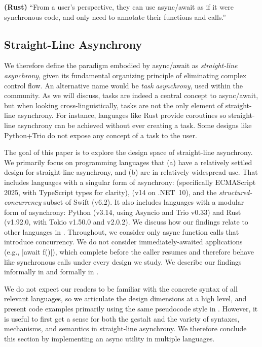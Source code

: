 \begin{displayquote}%
  \textbf{(Rust)}
  ``From a user's perspective, they can use async/await as if it were synchronous code, and only need to annotate their functions and calls.''~\cite{withoutboats_2394_2018}
\end{displayquote}

\subsection{Straight-Line Asynchrony}
\label{sec:straightline-async}

We therefore define the paradigm embodied by async/await as \emph{straight-line asynchrony}, given its fundamental organizing principle of eliminating complex control flow. An alternative name would be \emph{task asynchrony}, used within the \CSharp community. As we will discuss, tasks are indeed a central concept to async/await, but when looking cross-linguistically, tasks are not the only element of straight-line asynchrony. For instance, languages like Rust provide coroutines so straight-line asynchrony can be achieved without ever creating a task. Some designs like Python+Trio do not expose any concept of a task to the user.

The goal of this paper is to explore the design space of straight-line asynchrony. We primarily focus on programming languages that (a) have a relatively settled design for straight-line asynchrony, and (b) are in relatively widespread use. That includes languages with a singular form of asynchrony: \Js (specifically ECMAScript 2025, with TypeScript types for clarity), \CSharp (v14 on .NET~10), and the \emph{structured-concurrency} subset of Swift (v6.2). It also includes languages with a modular form of asynchrony: Python (v3.14, using Asyncio and Trio v0.33) and Rust (v1.92.0, with Tokio v1.50.0 and \smol v2.0.2). We discuss how our findings relate to other languages in .
Throughout, we consider only async function calls that introduce concurrency. We do not consider immediately-awaited applications (e.g., \code|await f()|), which complete before the caller resumes and therefore behave like synchronous calls under every design we study.
We describe our findings informally in  and formally in .

We do not expect our readers to be familiar with the concrete syntax of all relevant languages, so we articulate the design dimensions at a high level, and present code examples primarily using the same pseudocode style in . However, it is useful to first get a sense for both the gestalt and the variety of syntaxes, mechanisms, and semantics in straight-line asynchrony. We therefore conclude this section by implementing an async utility in multiple languages.

